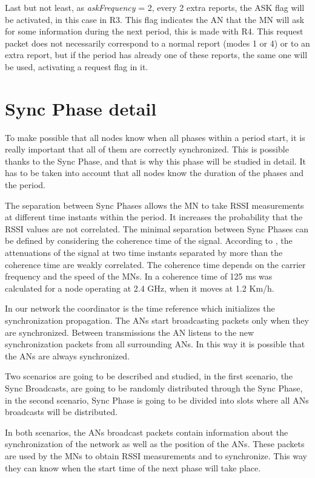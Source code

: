Last but not least, as \textit{askFrequency} = 2, every 2 extra reports, the ASK flag will be activated, in this case in R3. This flag indicates the 
\ac{AN} that the \ac{MN} will ask for some information during the next period, this is made with R4. This request packet does not necessarily correspond
to a normal report (modes 1 or 4) or to an extra report, but if the period has already one of these reports, the same one will be used, activating a request
flag in it.


\section{Sync Phase detail}

To make possible that all nodes know when all phases within a period start, it is really important that all of them are correctly synchronized. This is 
possible thanks to the Sync Phase, and that is why this phase will be studied in detail. It has to be taken into account that all nodes know the duration
of the phases and the period.

The separation between Sync Phases allows the \ac{MN} to take \ac{RSSI} measurements at different time instants within the period. It increases the 
probability that the \ac{RSSI} values are not correlated. The minimal separation between Sync Phases can be defined by considering the coherence time 
of the signal.  According to \cite{RSSIcorrelated}, the attenuations of the signal at two time instants separated by more than the coherence time 
are weakly correlated. The coherence time depends on the carrier frequency and the speed of the \acp{MN}. In \cite{RSSIcorrelated2} a coherence time 
of 125 ms was calculated for a node operating at 2.4 GHz, when it moves at 1.2 Km/h.

In our network the coordinator is the time reference which initializes the synchronization propagation. The \acp{AN} start broadcasting packets only 
when they are synchronized. Between transmissions the \ac{AN} listens to the new synchronization packets from all surrounding \acp{AN}. In this way 
it is possible that the \acp{AN} are always synchronized.

Two scenarios are going to be described and studied, in the first scenario, the Sync Broadcasts, are going to be randomly distributed through the Sync 
Phase, in the second scenario, Sync Phase is going to be divided into slots where all \acp{AN} broadcasts will be distributed.

In both scenarios, the \acp{AN} broadcast packets contain information about the synchronization of the network as well as the position 
of the \acp{AN}. These packets are used by the \acp{MN} to obtain \ac{RSSI} measurements and to synchronize. This way they can know when the start time of 
the next phase will take place.

